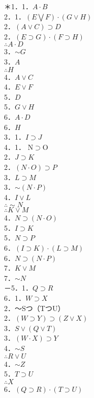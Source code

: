 ＊1．1．$A \cdot B$\\
2．1．$(E \bigvee F) \cdot(G \vee H)$\\
2．$(A \vee C) \supset D$\\
2．$(E \supset G) \cdot(F \supset H)$\\
$\therefore A \cdot D$\\
3．$\sim G$\\
3．$A$\\
$\therefore H$\\
4．$A \vee C$\\
4．$E \vee F$\\
5．$D$\\
5．$G \vee H$\\
6．$A \cdot D$\\
6．$H$\\
3．1．$I \supset J$\\
4．1． $\mathrm{N} \supset \mathrm{O}$\\
2．$J \supset K$\\
2．$(N \cdot O) \supset P$\\
3．$L \supset M$\\
3．$\sim(N \cdot P)$\\
4．$I \vee L$\\
$\therefore \sim N$\\
$\therefore K \vee M$\\
4．$N \supset(N \cdot O)$\\
5．$I \supset K$\\
5．$N \supset P$\\
6．$(I \supset K) \cdot(L \supset M)$\\
6．$N \supset(N \cdot P)$\\
7．$K \vee M$\\
7．$\sim N$\\
－5．1．$Q \supset R$\\
6．1．$W \supset X$\\
2．～Sつ（TつU）\\
2．$(W \supset Y) \supset(Z \vee X)$\\
3．$S \vee(Q \vee T)$\\
3．$(W \cdot X) \supset Y$\\
4．$\sim S$\\
$\therefore R \vee U$\\
4．$\sim Z$\\
5．$T \supset U$\\
$\therefore X$\\
6．$(Q \supset R) \cdot(T \supset U)$\\
